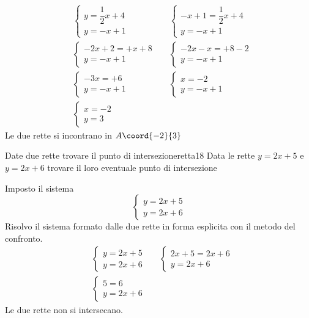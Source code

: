 \begin{align*}
	&\begin{cases} 
		y=\dfrac{1}{2}x+4\\
		y=-x+1
	\end{cases}&&\begin{cases} 
	-x+1=\dfrac{1}{2}x+4\\
	y=-x+1
\end{cases}\\
&\begin{cases} 
	-2x+2=+x+8\\
	y=-x+1
\end{cases}&&\begin{cases} 
-2x-x=+8-2\\
y=-x+1
\end{cases}\\
&\begin{cases} 
	-3x=+6\\
	y=-x+1
\end{cases}&&
\begin{cases} 
	x=-2\\
	y=-x+1
\end{cases}\\
&\begin{cases} 
	x=-2\\
	y=3
\end{cases}
\end{align*}
Le due rette si incontrano in $A\coord{-2}{3}$
\begin{cesempiot}{Date due rette trovare il punto di intersezione}{retta18}
	Data le rette $y=2x+5$ e $y=2x+6$ trovare il loro eventuale punto di intersezione
\end{cesempiot}
Imposto il sistema 
\[\begin{cases} 
y=2x+5\\
y=2x+6
\end{cases}\]
Risolvo il sistema formato dalle due rette in forma esplicita con il metodo del confronto.
\begin{align*}
	&\begin{cases} 
		y=2x+5\\
		y=2x+6
	\end{cases}&&\begin{cases} 
	2x+5=2x+6\\
	y=2x+6
\end{cases}\\
&\begin{cases} 
	5=6\\
	y=2x+6
\end{cases}
\end{align*}
Le due rette non si intersecano.